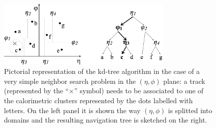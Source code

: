 \begin{figure}[b]
\begin{center}
\includegraphics*[width=0.75\textwidth]{figs/kdtree.png}
\caption{Pictorial representation of the kd-tree algorithm in the case
  of a very simple neighbor search problem in the $(\eta, \phi)$
  plane: a track (represented by the ``$\times$'' symbol) needs to be
  associated to one of the calorimetric clusters represented by the
  dots labelled with letters. On the left panel it is shown the way
  $(\eta, \phi)$ is splitted into domains and the resulting navigation tree is
  sketched on the right.}
\label{fig:kdtree}
\end{center}
\end{figure}



